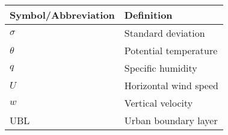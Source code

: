 \label{tab:symbols}
\begin{center}
	\renewcommand{\arraystretch}{1}%
	\begin{tabularx}{0.75\textwidth}{l X}
 		\hline
 		Symbol/Abbreviation & Definition \\
 		\hline
 		$\sigma$ & Standard deviation \\
 		$\theta$ & Potential temperature \\
 		$q$ & Specific humidity \\
 		$U$ & Horizontal wind speed \\
 		$w$ & Vertical velocity \\
 		UBL & Urban boundary layer \\
 		\hline
	\end{tabularx}
\end{center}